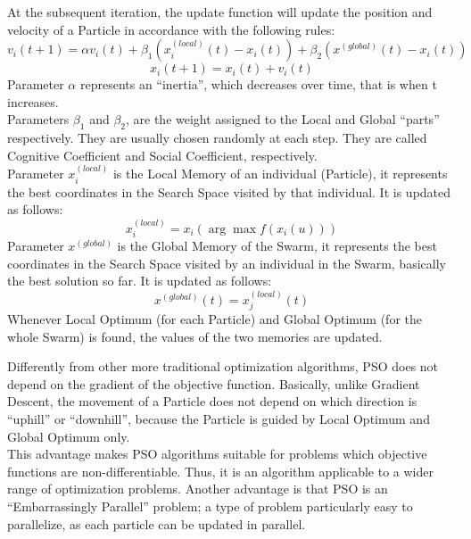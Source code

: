 \label{sec:UpdateOfParticles-3.1.1}At the subsequent iteration, the update function will update the position and velocity of a Particle in accordance with the following rules:
\begin{equation}
	v_i(t+1) = \alpha v_i(t) + \beta_1(x_i^{(local)}(t) - x_i(t)) + \beta_2(x^{(global)}(t) - x_i(t))
\end{equation}
\begin{equation}
	x_i(t+1) = x_i(t) + v_i(t)
\end{equation}
Parameter $\alpha$ represents an “inertia”, which decreases over time, that is when t increases.
\\[0.3cm]Parameters $\beta_1$ and $\beta_2$, are the weight assigned to the Local and Global “parts” respectively. They are usually chosen randomly at each step. They are called Cognitive Coefficient and Social Coefficient, respectively.
\\[0.3cm]Parameter  $x_i^{(local)}$  is the Local Memory of an individual (Particle), it represents the best coordinates in the Search Space visited by that individual. It is updated as follows:
\begin{equation}
	x_i^{(local)} = x_i(\arg \max f(x_i(u)))
\end{equation}
Parameter $x^{(global)}$ is the Global Memory of the Swarm, it represents the best coordinates in the Search Space visited by an individual in the Swarm, basically the best solution so far. It is updated as follows:
\begin{equation}
	x^{(global)}(t) = x_j^{(local)}(t)
\end{equation}
Whenever Local Optimum (for each Particle) and Global Optimum (for the whole Swarm) is found, the values of the two memories are updated.

Differently from other more traditional optimization algorithms, PSO does not depend on the gradient of the objective function.
Basically, unlike Gradient Descent, the movement of a Particle does not depend on which direction is “uphill” or “downhill”, because the Particle is guided by Local Optimum and Global Optimum only.
\\[0.3cm]This advantage makes PSO algorithms suitable for problems which objective functions are non-differentiable. Thus, it is an algorithm applicable to a wider range of optimization problems.
Another advantage is that PSO is an “Embarrassingly Parallel” problem; a type of problem particularly easy to parallelize, as each particle can be updated in parallel.

